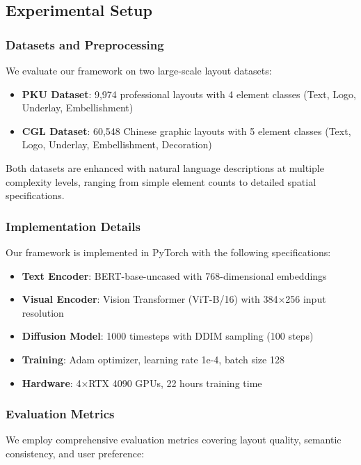 \documentclass[journal,article,submit,pdftex,moreauthors]{Definitions/mdpi}
\begin{document}
\subsection{Experimental Setup}

\subsubsection{Datasets and Preprocessing}

We evaluate our framework on two large-scale layout datasets:

\begin{itemize}
\item \textbf{PKU Dataset}: 9,974 professional layouts with 4 element classes (Text, Logo, Underlay, Embellishment)
\item \textbf{CGL Dataset}: 60,548 Chinese graphic layouts with 5 element classes (Text, Logo, Underlay, Embellishment, Decoration)
\end{itemize}

Both datasets are enhanced with natural language descriptions at multiple complexity levels, ranging from simple element counts to detailed spatial specifications.

\subsubsection{Implementation Details}

Our framework is implemented in PyTorch with the following specifications:
\begin{itemize}
\item \textbf{Text Encoder}: BERT-base-uncased with 768-dimensional embeddings
\item \textbf{Visual Encoder}: Vision Transformer (ViT-B/16) with 384×256 input resolution
\item \textbf{Diffusion Model}: 1000 timesteps with DDIM sampling (100 steps)
\item \textbf{Training}: Adam optimizer, learning rate 1e-4, batch size 128
\item \textbf{Hardware}: 4×RTX 4090 GPUs, 22 hours training time
\end{itemize}

\subsubsection{Evaluation Metrics}

We employ comprehensive evaluation metrics covering layout quality, semantic consistency, and user preference:
\end{document}
